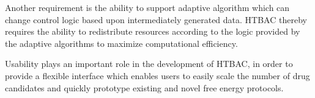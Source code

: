 



Another requirement is the ability to support adaptive algorithm which can 
change control logic based upon intermediately generated data. 
HTBAC thereby requires the ability to redistribute resources according to the 
logic provided by the adaptive algorithms to maximize computational efficiency.
 



Usability plays an important role in the development of HTBAC, in order to
provide a flexible interface which enables users to easily scale the number
of drug candidates and quickly prototype existing and novel free energy
protocols. 

